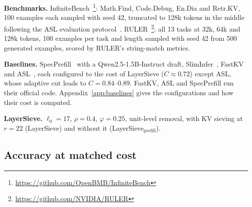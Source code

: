 \documentclass[10pt,conference]{IEEEtran}
\begin{document}
\textbf{Benchmarks.} InfiniteBench~\cite{zhang_etal_2024_bench}\footnote{\url{https://github.com/OpenBMB/InfiniteBench}}: Math.Find, Code.Debug, En.Dia and Retr.KV, 100 examples each sampled with seed 42, truncated to 128k tokens in the middle following the ASL evaluation protocol~\cite{taniguchi2026asl}. RULER~\cite{ruler2024}\footnote{\url{https://github.com/NVIDIA/RULER}}: all 13 tasks at 32k, 64k and 128k tokens, 100 examples per task and length sampled with seed 42 from 500 generated examples, scored by RULER's string-match metrics.

\textbf{Baselines.} SpecPrefill~\cite{liu2025specprefill} with a Qwen2.5-1.5B-Instruct draft, SlimInfer~\cite{long2026sliminfer}, FastKV~\cite{jo2026fastkv} and ASL~\cite{taniguchi2026asl}, each configured to the cost of LayerSieve ($C\approx0.72$) except ASL, whose adaptive cut leads to $C=0.84$--$0.89$. FastKV, ASL and SpecPrefill run their official code. Appendix~\ref{app:baselines} gives the configurations and how their cost is computed.

\textbf{LayerSieve.} $\ell_0=17$, $\rho=0.4$, $\varphi=0.25$, unit-level removal, with KV sieving at $r=22$ (LayerSieve) and without it (LayerSieve$_{\text{prefill}}$).

\subsection{Accuracy at matched cost}
\label{sec:exp-main}
\end{document}
